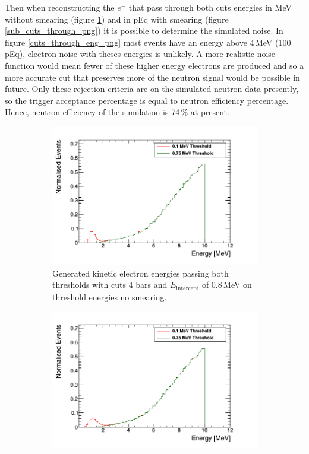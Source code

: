 \documentclass[12pt,a4paper]{article}
\begin{document}
Then when reconstructing the $e^-$ that pass through both cuts energies in MeV without smearing (figure \ref{sub_cuts_through_eng}) and in pEq with smearing (figure \ref{sub_cuts_through_png}) it is possible to determine the simulated noise. In figure \ref{cuts_through_eng_png} most events have an energy above 4\,MeV (100 pEq), electron noise with theses energies is unlikely. A more realistic noise function would mean fewer of these higher energy electrons are produced and so a more accurate cut that preserves more of the neutron signal would be possible in future. Only these rejection criteria are on the simulated neutron data presently, so the trigger acceptance percentage is equal to neutron efficiency percentage. Hence, neutron efficiency of the simulation is 74\,\% at present.  

\begin{figure}[H]
\centering
\begin{subfigure}{.5\textwidth}
  \centering
  \includegraphics[width=\linewidth]{e_thresh_energy.png}
  \captionsetup{width=.9\linewidth}
  \caption{Generated kinetic electron energies passing both thresholds with cuts 4 bars and $E_\textrm{intercept}$ of 0.8\,MeV on threshold energies no smearing.}
  \label{sub_cuts_through_eng}
\end{subfigure}%
\begin{subfigure}{.5\textwidth}
  \centering
  \includegraphics[width=\linewidth]{e_thresh_peq.png}

\end{subfigure}
\end{figure}
\end{document}
